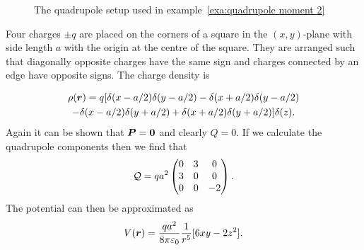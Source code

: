     \begin{example}\label{exa:quadrupole moment 2}
        \begin{figure}[ht]
            \centering
            \caption{The quadrupole setup used in example~\ref{exa:quadrupole moment 2}}
        \end{figure}
        Four charges \(\pm q\) are placed on the corners of a square in the \((x, y)\)-plane with side length \(a\) with the origin at the centre of the square.
        They are arranged such that diagonally opposite charges have the same sign and charges connected by an edge have opposite signs.
        The charge density is
        
        \begin{multline*}
            \rho(\bm{r}) = q[\delta(x - a/2)\delta(y - a/2) - \delta(x + a/2)\delta(y - a/2) \\- \delta(x - a/2)\delta(y + a/2) + \delta(x + a/2)\delta(y + a/2)]\delta(z).
        \end{multline*}
        Again it can be shown that \(\bm{P} = \bm{0}\) and clearly \(Q = 0\).
        If we calculate the quadrupole components then we find that
        \[
            \mathcal{Q} = qa^2
            \begin{pmatrix}
                0 & 3 & 0\\
                3 & 0 & 0\\
                0 & 0 & -2
            \end{pmatrix}
            .
        \]
        The potential can then be approximated as
        \[V(\bm{r}) = \frac{qa^2}{8\pi\varepsilon_0}\frac{1}{r^5}[6xy - 2z^2].\]
    \end{example}

